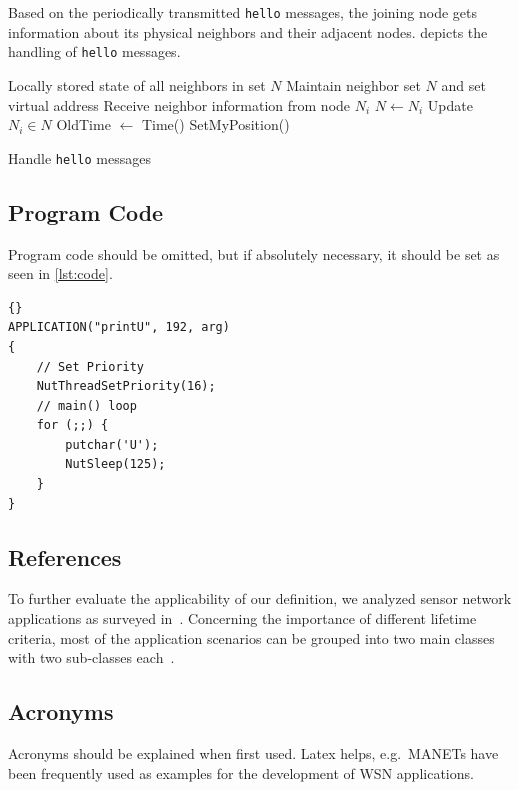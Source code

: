 Based on the periodically transmitted \texttt{hello} messages, the joining node gets information about its physical neighbors and their adjacent nodes.  depicts the handling of \texttt{hello} messages.

\begin{algorithm}
\begin{algorithmic}[1]
\REQUIRE Locally stored state of all neighbors in set $N$
\ENSURE Maintain neighbor set $N$ and set virtual address
\STATE Receive neighbor information from node $N_i$
	\STATE $N \gets N_i$
\ELSE
	\STATE Update $N_i \in N$
\ENDIF
{}
	\STATE OldTime $\gets$ Time()
	\STATE SetMyPosition()
\ENDIF
\end{algorithmic}
\caption{Handle \texttt{hello} messages}
\label{alg:H_hello}
\end{algorithm}

\subsection{Program Code}

Program code should be omitted, but if absolutely necessary, it should be set as seen in \cref{lst:code}.

\begin{lstlisting}[style=txt,caption=Sample application,label=lst:code]{}
APPLICATION("printU", 192, arg)
{
    // Set Priority
    NutThreadSetPriority(16);
    // main() loop
    for (;;) {
        putchar('U');
        NutSleep(125);
    }
}
\end{lstlisting}

\subsection{References}

To further evaluate the applicability of our definition, we analyzed sensor network applications as surveyed in~\cite{akyildiz2002survey,arampatzis2005survey,khemapach2005survey}. Concerning the importance of different lifetime criteria, most of the application scenarios can be grouped into two main classes with two sub-classes each~\cite{dietrich2009lifetime}.


\subsection{Acronyms}

Acronyms should be explained when first used. Latex helps, e.g.\ \acp{MANET} have been frequently used as examples for the development of \ac{WSN} applications.

